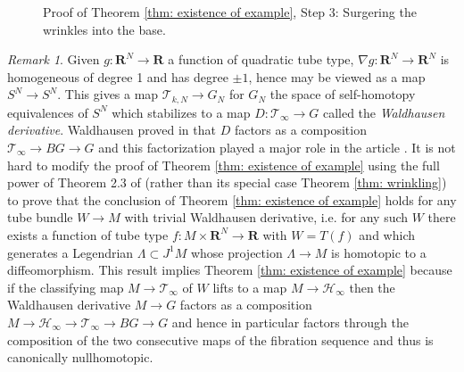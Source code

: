 \documentclass{amsart}
\newcommand\cH{\mathcal{H}}
\newcommand\cT{\mathcal{T}}
\def\bR{\mathbf{R}}
\theoremstyle{definition}
\theoremstyle{remark}
\newtheorem{inductive lemma}[theorem]{Inductive Lemma}
\newtheorem{remark}[theorem]{Remark}
\begin{document}
{\begin{figure}[htbp]
\begin{center}
\caption{Proof of Theorem \ref{thm: existence of example}, Step 3: Surgering the wrinkles into the base.}
\label{Figure1907}
\end{center}
\end{figure}
%
}

\begin{remark}
Given $g:\bR^N \to \bR$ a function of quadratic tube type, $\nabla g:\bR^N \to \bR^N$ is homogeneous of degree 1 and has degree $\pm 1$, hence may be viewed as a map $S^N \to S^N$. This gives a map $\cT_{k,N} \to G_N$ for $G_N$ the space of self-homotopy equivalences of $S^N$ which stabilizes to a map $D: \cT_\infty \to G$ called the {\em Waldhausen derivative}. Waldhausen proved in \cite{W82} that $D$ factors as a composition $\cT_\infty \to BG \to G$ and this factorization played a major role in the article \cite{AACK}. It is not hard to modify the proof of Theorem \ref{thm: existence of example} using the full power of Theorem 2.3 of \cite{EM00} (rather than its special case Theorem \ref{thm: wrinkling}) to prove that the conclusion of Theorem \ref{thm: existence of example} holds for any tube bundle $W \to M$ with trivial Waldhausen derivative, i.e. for any such $W$ there exists a function of tube type $f:M \times \bR^N \to \bR$ with $W=T(f)$ and which generates a Legendrian $\Lambda \subset J^1M$ whose projection $\Lambda \to M$ is homotopic to a diffeomorphism. This result implies Theorem \ref{thm: existence of example} because if the classifying map $M \to \cT_\infty$ of $W$ lifts to a map $M \to \cH_\infty$ then the Waldhausen derivative $M \to G$ factors as a composition $M \to \cH_\infty \to \cT_\infty \to BG \to G$ and hence in particular factors through the composition of the two consecutive maps of the fibration sequence and thus is canonically nullhomotopic. 

\end{remark}
\end{document}
